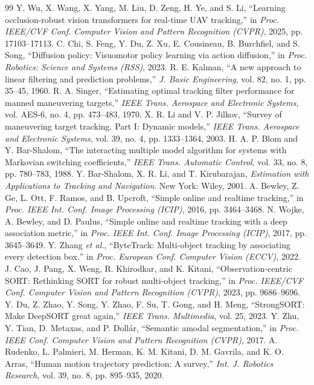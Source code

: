\documentclass[12pt,a4paper]{article}
\begin{document}
\begin{thebibliography}{99}
 Y. Wu, X. Wang, X. Yang, M. Liu, D. Zeng, H. Ye, and S. Li, ``Learning occlusion-robust vision transformers for real-time UAV tracking,'' in \emph{Proc. IEEE/CVF Conf. Computer Vision and Pattern Recognition (CVPR)}, 2025, pp. 17103–17113.
 C. Chi, S. Feng, Y. Du, Z. Xu, E. Cousineau, B. Burchfiel, and S. Song, ``Diffusion policy: Visuomotor policy learning via action diffusion,'' in \emph{Proc. Robotics: Science and Systems (RSS)}, 2023.
 R. E. Kalman, ``A new approach to linear filtering and prediction problems,'' \emph{J. Basic Engineering}, vol. 82, no. 1, pp. 35–45, 1960.
 R. A. Singer, ``Estimating optimal tracking filter performance for manned maneuvering targets,'' \emph{IEEE Trans. Aerospace and Electronic Systems}, vol. AES-6, no. 4, pp. 473–483, 1970.
 X. R. Li and V. P. Jilkov, ``Survey of maneuvering target tracking. Part I: Dynamic models,'' \emph{IEEE Trans. Aerospace and Electronic Systems}, vol. 39, no. 4, pp. 1333–1364, 2003.
 H. A. P. Blom and Y. Bar-Shalom, ``The interacting multiple model algorithm for systems with Markovian switching coefficients,'' \emph{IEEE Trans. Automatic Control}, vol. 33, no. 8, pp. 780–783, 1988.
 Y. Bar-Shalom, X. R. Li, and T. Kirubarajan, \emph{Estimation with Applications to Tracking and Navigation}. New York: Wiley, 2001.
 A. Bewley, Z. Ge, L. Ott, F. Ramos, and B. Upcroft, ``Simple online and realtime tracking,'' in \emph{Proc. IEEE Int. Conf. Image Processing (ICIP)}, 2016, pp. 3464–3468.
 N. Wojke, A. Bewley, and D. Paulus, ``Simple online and realtime tracking with a deep association metric,'' in \emph{Proc. IEEE Int. Conf. Image Processing (ICIP)}, 2017, pp. 3645–3649.
 Y. Zhang \emph{et al.}, ``ByteTrack: Multi-object tracking by associating every detection box,'' in \emph{Proc. European Conf. Computer Vision (ECCV)}, 2022.
 J. Cao, J. Pang, X. Weng, R. Khirodkar, and K. Kitani, ``Observation-centric SORT: Rethinking SORT for robust multi-object tracking,'' in \emph{Proc. IEEE/CVF Conf. Computer Vision and Pattern Recognition (CVPR)}, 2023, pp. 9686–9696.
 Y. Du, Z. Zhao, Y. Song, Y. Zhao, F. Su, T. Gong, and H. Meng, ``StrongSORT: Make DeepSORT great again,'' \emph{IEEE Trans. Multimedia}, vol. 25, 2023.
 Y. Zhu, Y. Tian, D. Metaxas, and P. Dollár, ``Semantic amodal segmentation,'' in \emph{Proc. IEEE Conf. Computer Vision and Pattern Recognition (CVPR)}, 2017.
 A. Rudenko, L. Palmieri, M. Herman, K. M. Kitani, D. M. Gavrila, and K. O. Arras, ``Human motion trajectory prediction: A survey,'' \emph{Int. J. Robotics Research}, vol. 39, no. 8, pp. 895–935, 2020.

\end{thebibliography}
\end{document}
